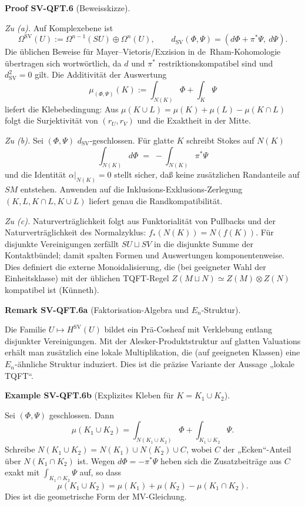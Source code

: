 \documentclass[10pt, letterpaper]{article}
\newcommand{\CustomHeading}[3]{%
  \par\medskip\noindent%
  \textbf{#1 #2} \textnormal{(#3)}.\enskip%
}
\newenvironment{REM}[2]{\begin{unitbox}\CustomHeading{Remark}{#1}{#2}}{\end{unitbox}}
\newenvironment{EXA}[2]{\begin{unitbox}\CustomHeading{Example}{#1}{#2}}{\end{unitbox}}
\newenvironment{PROOF}[2]{\begin{unitbox}\CustomHeading{Proof}{#1}{#2}}{\end{unitbox}}
\begin{document}
\begin{PROOF}{SV-QFT.6}{Beweisskizze}
\emph{Zu (a).} Auf Komplexebene ist
\[
\Omega^{\operatorname{SV}}(U):=\Omega^{n-1}(SU)\oplus\Omega^n(U),
\qquad
d_{\operatorname{SV}}(\Phi,\Psi)=(d\Phi+\pi^*\Psi,\ d\Psi).
\]
Die üblichen Beweise für Mayer--Vietoris/Exzision in de~Rham-Kohomologie übertragen sich wortwörtlich, da $d$ und $\pi^*$ restriktionskompatibel sind und $d_{\operatorname{SV}}^2=0$ gilt. Die Additivität der Auswertung 
\[
\mu_{(\Phi,\Psi)}(K):=\int_{N(K)}\Phi+\int_K\Psi
\]
liefert die Klebebedingung: Aus $\mu(K\cup L)=\mu(K)+\mu(L)-\mu(K\cap L)$ folgt die Surjektivität von $(r_U,r_V)$ und die Exaktheit in der Mitte.

\smallskip
\emph{Zu (b).} Sei $(\Phi,\Psi)$ $d_{\operatorname{SV}}$-geschlossen. Für glatte $K$ schreibt Stokes auf $N(K)$
\[
\int_{N(K)}d\Phi\;=\;-\int_{N(K)}\pi^*\Psi
\]
und die Identität
\(
\alpha|_{N(K)}=0
\)
stellt sicher, daß keine zusätzlichen Randanteile auf $SM$ entstehen. Anwenden auf die Inklusions-Exklusions-Zerlegung $(K,L,K\cap L,K\cup L)$ liefert genau die Randkompatibilität.

\smallskip
\emph{Zu (c).} Naturverträglichkeit folgt aus Funktorialität von Pullbacks und der Naturverträglichkeit des Normalzyklus: $f_*(N(K))=N(f(K))$. Für disjunkte Vereinigungen zerfällt $SU\sqcup SV$ in die disjunkte Summe der Kontaktbündel; damit spalten Formen und Auswertungen komponentenweise. Dies definiert die externe Monoidalisierung, die (bei geeigneter Wahl der Einheitsklasse) mit der üblichen TQFT-Regel $Z(M\sqcup N)\simeq Z(M)\otimes Z(N)$ kompatibel ist (Künneth).
\end{PROOF}

\begin{REM}{SV-QFT.6a}{Faktorisation-Algebra und \texorpdfstring{$E_n$}{En}-Struktur}
Die Familie $U\mapsto H^{\operatorname{SV}}(U)$ bildet ein Prä-Cosheaf mit Verklebung entlang disjunkter Vereinigungen. Mit der Alesker-Produktstruktur auf glatten Valuations erhält man zusätzlich eine lokale Multiplikation, die (auf geeigneten Klassen) eine $E_n$-ähnliche Struktur induziert. Dies ist die präzise Variante der Aussage „lokale TQFT“.
\end{REM}

\begin{EXA}{SV-QFT.6b}{Explizites Kleben für $K=K_1\cup K_2$}
Sei $(\Phi,\Psi)$ geschlossen. Dann
\[
\mu(K_1\cup K_2)=\int_{N(K_1\cup K_2)}\Phi+\int_{K_1\cup K_2}\Psi.
\]
Schreibe $N(K_1\cup K_2)=N(K_1)\cup N(K_2)\cup C$, wobei $C$ der „Ecken“-Anteil über $N(K_1\cap K_2)$ ist. Wegen $d\Phi=-\pi^*\Psi$ heben sich die Zusatzbeiträge aus $C$ exakt mit $\int_{K_1\cap K_2}\Psi$ auf, so dass
\[
\mu(K_1\cup K_2)=\mu(K_1)+\mu(K_2)-\mu(K_1\cap K_2).
\]
Dies ist die geometrische Form der MV-Gleichung.
\end{EXA}
\end{document}
